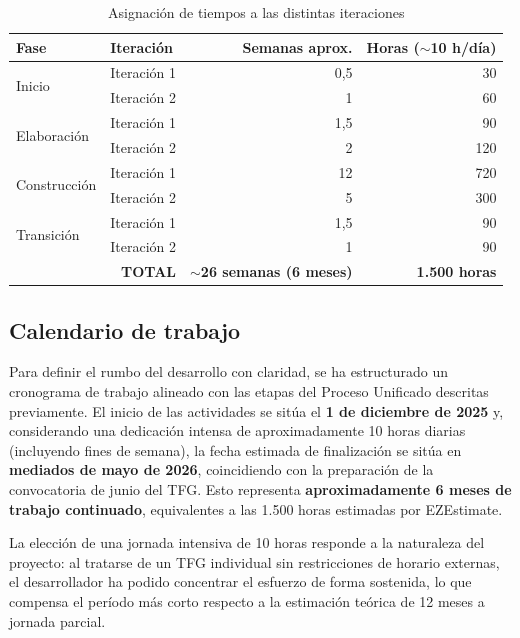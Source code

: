 \documentclass[11pt, a4paper]{article}
\begin{document}
\begin{table}[H]
\centering
\begin{tabular}{|l|l|r|r|}
\hline
\textbf{Fase} & \textbf{Iteración} & \textbf{Semanas aprox.} & \textbf{Horas ($\sim$10 h/día)} \\
\hline
\multirow{2}{*}{Inicio} & Iteración 1 & 0,5 & 30 \\
\cline{2-4}
 & Iteración 2 & 1 & 60 \\
\hline
\multirow{2}{*}{Elaboración} & Iteración 1 & 1,5 & 90 \\
\cline{2-4}
 & Iteración 2 & 2 & 120 \\
\hline
\multirow{2}{*}{Construcción} & Iteración 1 & 12 & 720 \\
\cline{2-4}
 & Iteración 2 & 5 & 300 \\
\hline
\multirow{2}{*}{Transición} & Iteración 1 & 1,5 & 90 \\
\cline{2-4}
 & Iteración 2 & 1 & 90 \\
\hline
\multicolumn{2}{|r|}{\textbf{TOTAL}} & \textbf{$\sim$26 semanas (6 meses)} & \textbf{1.500 horas} \\
\hline
\end{tabular}
\caption{Asignación de tiempos a las distintas iteraciones}
\end{table}

\subsection{Calendario de trabajo}

Para definir el rumbo del desarrollo con claridad, se ha estructurado un cronograma de trabajo alineado con las etapas del Proceso Unificado descritas previamente. El inicio de las actividades se sitúa el \textbf{1 de diciembre de 2025} y, considerando una dedicación intensa de aproximadamente 10 horas diarias (incluyendo fines de semana), la fecha estimada de finalización se sitúa en \textbf{mediados de mayo de 2026}, coincidiendo con la preparación de la convocatoria de junio del TFG. Esto representa \textbf{aproximadamente 6 meses de trabajo continuado}, equivalentes a las 1.500 horas estimadas por EZEstimate.

La elección de una jornada intensiva de 10 horas responde a la naturaleza del proyecto: al tratarse de un TFG individual sin restricciones de horario externas, el desarrollador ha podido concentrar el esfuerzo de forma sostenida, lo que compensa el período más corto respecto a la estimación teórica de 12 meses a jornada parcial.
\end{document}
